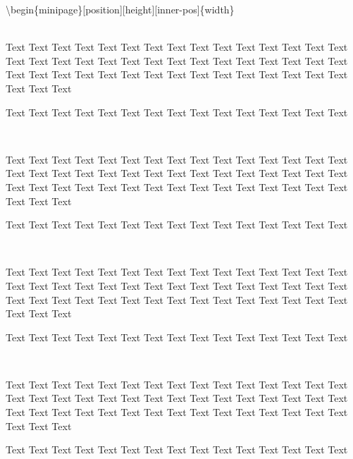 
\textbackslash begin\{minipage\}[position][height][inner-pos]\{width\}\\
\ \\


\begin{minipage}[t]{.47\textwidth}
      Text Text Text Text Text Text Text Text Text Text Text Text Text Text Text Text Text Text Text Text Text Text Text Text Text Text Text Text Text Text Text Text Text Text Text Text Text Text Text Text Text Text Text Text Text Text Text Text
\end{minipage}
\hspace{0.06\textwidth}
\begin{minipage}[t]{.47\textwidth}
      Text Text Text Text Text Text Text Text Text Text Text Text Text Text Text  
      \vspace{\fill}
\end{minipage}
\ \\

\begin{minipage}[b]{.47\textwidth}
      Text Text Text Text Text Text Text Text Text Text Text Text Text Text Text Text Text Text Text Text Text Text Text Text Text Text Text Text Text Text Text Text Text Text Text Text Text Text Text Text Text Text Text Text Text Text Text Text
\end{minipage}
\hspace{0.06\textwidth}
\begin{minipage}[t]{.47\textwidth}
      Text Text Text Text Text Text Text Text Text Text Text Text Text Text Text  
      \vspace{\fill}
\end{minipage}
\ \\

\begin{minipage}[t]{.47\textwidth}
      Text Text Text Text Text Text Text Text Text Text Text Text Text Text Text Text Text Text Text Text Text Text Text Text Text Text Text Text Text Text Text Text Text Text Text Text Text Text Text Text Text Text Text Text Text Text Text Text
\end{minipage}
\hspace{0.06\textwidth}
\begin{minipage}[b]{.47\textwidth}
      Text Text Text Text Text Text Text Text Text Text Text Text Text Text Text  
      \vspace{\fill}
\end{minipage}
\ \\

\begin{minipage}[b]{.47\textwidth}
      Text Text Text Text Text Text Text Text Text Text Text Text Text Text Text Text Text Text Text Text Text Text Text Text Text Text Text Text Text Text Text Text Text Text Text Text Text Text Text Text Text Text Text Text Text Text Text Text
\end{minipage}
\hspace{0.06\textwidth}
\begin{minipage}[b]{.47\textwidth}
      Text Text Text Text Text Text Text Text Text Text Text Text Text Text Text  
      \vspace{\fill}
\end{minipage}